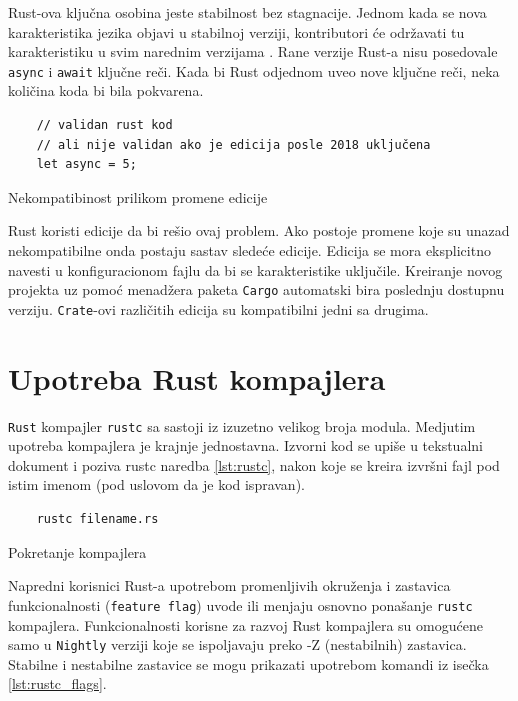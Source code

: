 \documentclass[11pt]{article}
\begin{document}
Rust-ova ključna osobina jeste stabilnost bez stagnacije. Jednom kada se nova 
karakteristika jezika objavi u stabilnoj verziji, kontributori će održavati 
tu karakteristiku u svim narednim verzijama \cite{editions}.
Rane verzije Rust-a nisu posedovale \verb|async| i \verb|await| ključne reči.
Kada bi Rust odjednom uveo nove ključne reči, neka količina koda bi bila pokvarena.

\begin{listing}[H]
\begin{verbatim}
    // validan rust kod 
    // ali nije validan ako je edicija posle 2018 uključena
    let async = 5; 
\end{verbatim}
\caption{Nekompatibinost prilikom promene edicije}
\label{lst:edition}
\end{listing}


Rust koristi edicije da bi rešio ovaj problem. Ako postoje promene koje su unazad 
nekompatibilne onda postaju sastav sledeće edicije. Edicija se mora eksplicitno navesti 
u konfiguracionom fajlu da bi se karakteristike uključile. Kreiranje novog projekta uz 
pomoć menadžera paketa \verb|Cargo| automatski bira poslednju dostupnu verziju.
\verb|Crate|-ovi različitih edicija su kompatibilni jedni sa drugima.




\newpage

\section{Upotreba Rust kompajlera}

\verb|Rust| kompajler \verb|rustc| sa sastoji iz izuzetno velikog broja modula. 
Medjutim upotreba kompajlera je krajnje jednostavna.
Izvorni kod se upiše u tekstualni dokument i poziva rustc naredba \ref{lst:rustc}, 
nakon koje se kreira izvršni fajl pod istim imenom (pod uslovom da je kod ispravan).
\begin{listing}[H]
\begin{verbatim}
    rustc filename.rs
\end{verbatim}
\caption{Pokretanje kompajlera}
\label{lst:rustc}
\end{listing}
Napredni korisnici Rust-a upotrebom promenljivih okruženja i zastavica funkcionalnosti 
(\verb|feature flag|) uvode ili menjaju osnovno ponašanje \verb|rustc| kompajlera.
Funkcionalnosti korisne za razvoj Rust kompajlera su omogućene samo u \verb|Nightly| verziji koje se
ispoljavaju preko -Z (nestabilnih) zastavica. Stabilne i nestabilne zastavice se mogu prikazati upotrebom
komandi iz isečka \ref{lst:rustc_flags}.
\end{document}
